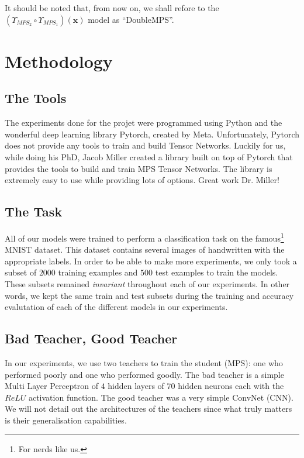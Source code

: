 \documentclass{article}
\theoremstyle{definition}
\theoremstyle{definition}
\begin{document}
It should be noted that, from now on, we shall refore to the $\left(\Upsilon_{MPS_2} \circ \Upsilon_{MPS_1}\right)(\mathbf{x})$ model as \enquote{DoubleMPS}.

\section{Methodology}

\subsection{The Tools}
The experiments done for the projet were programmed using Python and the wonderful deep learning library Pytorch, created by Meta.
Unfortunately, Pytorch does not provide any tools to train and build Tensor Networks. 
Luckily for us, while doing his PhD, Jacob Miller created a library \cite{torchmps} built on top of Pytorch that provides the tools to build and train MPS Tensor Networks. The library is extremely easy to use while providing lots of options. Great work Dr. Miller!

\subsection{The Task}
All of our models were trained to perform a classification task on the famous\footnote{For nerds like us.} MNIST dataset. This dataset contains several images of handwritten with the appropriate labels. In order to be able to make more experiments, we only took a subset of $2000$ training examples and $500$ test examples to train the models. These subsets remained \emph{invariant} throughout each of our experiments. In other words, we kept the same train and test subsets during the training and accuracy evalutation of each of the different models in our experiments.

\subsection{Bad Teacher, Good Teacher}
In our experiments, we use two teachers to train the student (MPS): one who performed poorly and one who performed goodly.
The bad teacher is a simple Multi Layer Perceptron of $4$ hidden layers of $70$ hidden neurons each with the $ReLU$ activation function.  The good teacher was a very simple ConvNet (CNN). We will not detail out the architectures of the teachers since what truly matters is their generalisation capabilities.
\end{document}
